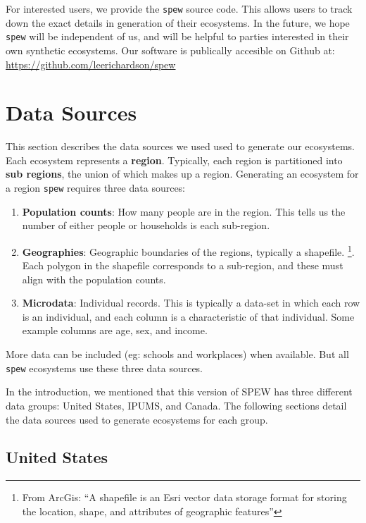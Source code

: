 \documentclass{article}
\begin{document}
	For interested users, we provide the \verb|spew| source code. This allows users to track down the exact details in generation of their ecosystems. In the future, we hope \verb|spew| will be independent of us, and will be helpful to parties interested in their own synthetic ecosystems. Our software is publically accesible on Github at:  \\

	\url{https://github.com/leerichardson/spew} \\

\newpage 
\section{Data Sources}

	 	This section describes the data sources we used used to generate our ecosystems. Each ecosystem represents a \textbf{region}. Typically, each region is partitioned into \textbf{sub regions}, the union of which makes up a region. Generating an ecosystem for a region \verb|spew| requires three data sources:

	 	\begin{enumerate}
			\item \textbf{Population counts}: How many people are in the region. This tells us the number of either people or households is each sub-region. 
			\item \textbf{Geographies}: Geographic boundaries of the regions, typically a shapefile. \footnote{From ArcGis: ``A shapefile is an Esri vector data storage format for storing the location, shape, and attributes of geographic features''}. Each polygon in the shapefile corresponds to a sub-region, and these must align with the population counts. 
			\item \textbf{Microdata}: Individual records. This is typically a data-set in which each row is an individual, and each column is a characteristic of that individual. Some example columns are age, sex, and income.
		\end{enumerate}

		More data can be included (eg: schools and workplaces) when available. But all \verb|spew| ecosystems use these three data sources.

		In the introduction, we mentioned that this version of SPEW has three different data groups: United States, IPUMS, and Canada. The following sections detail the data sources used to generate ecosystems for each group. 

	\subsection{United States}
		
\end{document}
